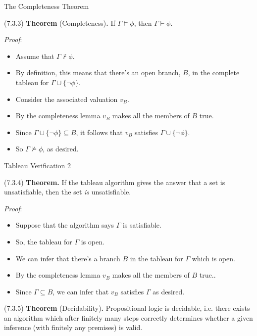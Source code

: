 \documentclass[../slides.tex]{subfiles}
\begin{document}
\begin{frame}{The Completeness Theorem}

(7.3.3) \textbf{Theorem} (Completeness)\textbf{.} If $\Gamma\vDash\phi$, then $\Gamma\vdash\phi$.

\emph{Proof}:

	\begin{itemize}
		
		\item Assume that $\Gamma\nvdash\phi$.
		
		\item By definition, this means that there's an open branch, $B$, in the complete tableau for $\Gamma\cup\{\neg\phi\}$.
		
		\item Consider the associated valuation $v_B$.
		
		\item By the completeness lemma $v_B$ makes all the members of $B$ true.
		
		\item Since $\Gamma\cup\{\neg\phi\}\subseteq B$, it follows that $v_B$ satisfies $\Gamma\cup\{\neg\phi\}$.
		
		\item So $\Gamma\nvDash\phi$, as desired.
	
	\end{itemize}

\end{frame}

\begin{frame}{Tableau Verification 2}

	(7.3.4) \textbf{Theorem.} If the tableau algorithm gives the answer that a set is unsatisfiable, then the set \emph{is} unsatisfiable. 

	\emph{Proof}:
	
	\begin{itemize}
	
		\item Suppose that the algorithm says $\Gamma$ is satisfiable.
		
		\item So, the tableau for $\Gamma$ is open.
				
		\item We can infer that there's a branch $B$ in the tableau for $\Gamma$ which is open. 
	
		\item By the completeness lemma $v_B$ makes all the members of $B$ true..
		
		\item Since $\Gamma\subseteq B$, we can infer that $v_B$ satisfies $\Gamma$ as desired.
	
	\end{itemize}
	
	(7.3.5) \textbf{Theorem} (Decidability)\textbf{.} 	Propositional logic is decidable, i.e. there exists an algorithm which after finitely many steps correctly determines whether a given inference (with finitely any premises) is valid.


\end{frame}
\end{document}
